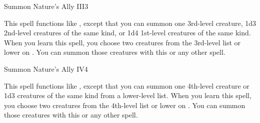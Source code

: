 \begin{spellsection}{Summon Nature's Ally III}{3}
\begin{spellheader}
\end{spellheader}
\begin{spellcontent}
    \spelleffect This spell functions like , except that you can summon one 3rd-level creature, 1d3 2nd-level creatures of the same kind, or 1d4 1st-level creatures of the same kind. When you learn this spell, you choose two creatures from the 3rd-level list or lower on . You can summon those creatures with this or any other  spell.
    \spelldur \durshort \dismissable
\end{spellcontent}
\begin{spellfooter}
\end{spellfooter}
\end{spellsection}

\begin{spellsection}{Summon Nature's Ally IV}{4}
\begin{spellheader}
\end{spellheader}
\begin{spellcontent}
    \spelleffect This spell functions like , except that you can summon one 4th-level creature or 1d3 creatures of the same kind from a lower-level list. When you learn this spell, you choose two creatures from the 4th-level list or lower on . You can summon those creatures with this or any other  spell.
    \spelldur \durshort \dismissable
\end{spellcontent}
\begin{spellfooter}
\end{spellfooter}
\end{spellsection}

